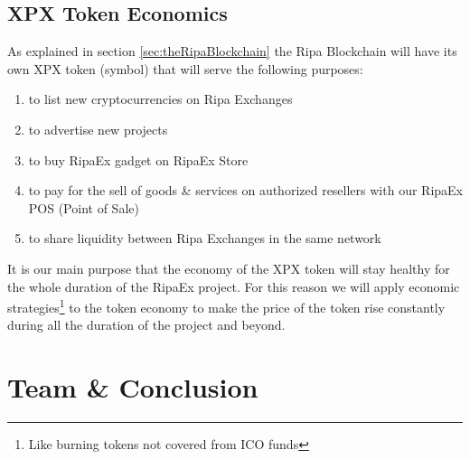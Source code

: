 \documentclass[11pt,fleqn,oneside]{book} %
\begin{document}
\section{XPX Token Economics}
As explained in section \ref{sec:theRipaBlockchain} the Ripa Blockchain will have its own XPX token (\PHP symbol) that 
will serve the following purposes:
	\begin{enumerate}
		\item to list new cryptocurrencies on Ripa Exchanges
		\item to advertise new projects
		\item to buy RipaEx gadget on RipaEx Store
		\item to pay for the sell of goods \& services on authorized resellers with our RipaEx POS (Point of Sale)
		\item to share liquidity between Ripa Exchanges in the same network
	\end{enumerate}
It is our main purpose that the economy of the XPX token will stay healthy for the whole duration of the RipaEx project. For 
this reason we will apply economic strategies\footnote{Like burning tokens not covered from ICO funds} 
to the token economy to make the price of the token rise constantly during all the duration of the project and beyond.




\chapter{Team \& Conclusion}
\end{document}

